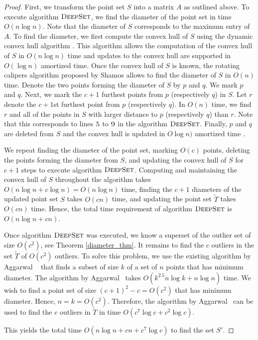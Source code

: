 \documentclass[lotsofwhite]{patmorin}
\begin{document}
\begin{proof}
First, we transform the point set $S$ into a matrix $A$ as outlined above. To execute algorithm $\textsc{DeepSet}$, we find the diameter of the point set in time $O(n\log n)$. Note that the diameter of $S$ corresponds to the maximum entry of $A$. To find the diameter, we first compute the convex hull of $S$ using the dynamic convex hull algorithm \cite{bj02}. This algorithm allows the computation of the convex hull of $S$ in $O(n \log n)$ time and updates to the convex hull are supported in $O(\log n)$ amortized time. Once the convex hull of $S$ is known, the rotating calipers algorithm proposed by Shamos \cite{s78} allows to find the diameter of $S$ in $O(n)$ time. Denote the two points forming the diameter of $S$ by $p$ and $q$. We mark $p$ and $q$. Next, we mark the $c+1$ furthest points from $p$ (respectively $q$) in $S$. Let $r$ denote the $c+1$st furthest point from $p$ (respectively $q$). In $O(n)$ time, we find $r$ and all of the points in $S$ with larger distance to $p$ (respectively $q$) than $r$. Note that this corresponds to lines $\textsc{5}$ to $\textsc{9}$ in the algorithm $\textsc{DeepSet}$. Finally, $p$ and $q$ are deleted from $S$ and the convex hull is updated in $O\log n)$ amortized time \cite{bj02}.

We repeat finding the diameter of the point set, marking $O(c)$ points, deleting the points forming the diameter from $S$, and updating the convex hull of $S$ for $c+1$ steps to execute algorithm $\textsc{DeepSet}$. Computing and maintaining the convex hull of $S$ throughout the algorithm takes $O(n\log n +c\log n) = O(n\log n)$ time, finding the $c+1$ diameters of the updated point set $S$ takes $O(cn)$ time, and updating the point set $\tilde{T}$ takes $O(c n)$ time. Hence, the total time requirement of algorithm $\textsc{DeepSet}$ is $O(n\log n + cn)$.

Once algorithm $\textsc{DeepSet}$ was executed, we know a superset of the outlier set of size $O(c^2)$, see Theorem \ref{diameter_thm}. It remains to find the $c$ outliers in the set $\tilde{T}$ of $O(c^2)$ outliers. To solve this problem, we use the existing algorithm by Aggarwal \etal\ \cite{aiks89} that finds a subset of size $k$ of a set of $n$ points that has minimum diameter. The algorithm by Aggarwal \etal\ takes $O(k^{2.5}n \log k + n\log n)$ time. We wish to find a point set of size $(c+1)^2-c = O(c^2)$ that has minimum diameter. Hence, $n=k=O(c^2)$. Therefore, the algorithm by Aggarwal \etal\ can be used to find the $c$ outliers in $\tilde{T}$ in time $O(c^7 \log c + c^2 \log c)$.

This yields the total time $O(n\log n + cn + c^7 \log c)$ to find the set $S'$.
\end{proof}
\end{document}
